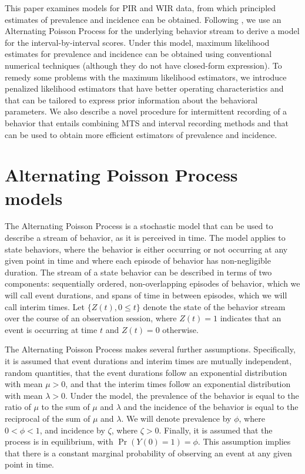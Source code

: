 \documentclass[man, noextraspace, floatsintext]{apa6}\usepackage[]{graphicx}\usepackage[]{color}
\begin{document}
This paper examines models for PIR and WIR data, from which principled estimates of prevalence and incidence can be obtained. 
Following \citet{Brown1977estimation}, we use an Alternating Poisson Process for the underlying behavior stream to derive a model for the interval-by-interval scores. 
Under this model, maximum likelihood estimates for prevalence and incidence can be obtained using conventional numerical techniques (although they do not have closed-form expression). 
To remedy some problems with the maximum likelihood estimators, we introduce penalized likelihood estimators that have better operating characteristics and that can be tailored to express prior information about the behavioral parameters.
We also describe a novel procedure for intermittent recording of a behavior that entails combining MTS and interval recording methods and that can be used to obtain more efficient estimators of prevalence and incidence.

\section{Alternating Poisson Process models}
\label{sec:APP}

The Alternating Poisson Process is a stochastic model that can be used to describe a stream of behavior, as it is perceived in time. 
The model applies to state behaviors, where the behavior is either occurring or not occurring at any given point in time and where each episode of behavior has non-negligible duration. 
The stream of a state behavior can be described in terms of two components: sequentially ordered, non-overlapping episodes of behavior, which we will call event durations, and spans of time in between episodes, which we will call interim times. 
Let $\{Z(t), 0 \leq t\}$ denote the state of the behavior stream over the course of an observation session, where $Z(t) = 1$ indicates that an event is occurring at time $t$ and $Z(t) = 0$ otherwise.

The Alternating Poisson Process makes several further assumptions. 
Specifically, it is assumed that event durations and interim times are mutually independent, random quantities, that the event durations follow an exponential distribution with mean $\mu > 0$, and that the interim times follow an exponential distribution with mean $\lambda > 0$. 
Under the model, the prevalence of the behavior is equal to the ratio of $\mu$ to the sum of $\mu$ and $\lambda$ and the incidence of the behavior is equal to the reciprocal of the sum of $\mu$ and $\lambda$. 
We will denote prevalence by $\phi$, where $0 < \phi < 1$, and incidence by $\zeta$, where $\zeta > 0$. Finally, it is assumed that the process is in equilibrium, with $\Pr\left(Y(0) = 1\right) = \phi$. 
This assumption implies that there is a constant marginal probability of observing an event at any given point in time.
\end{document}
